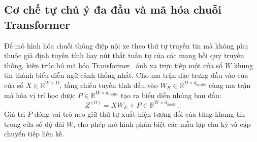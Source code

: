 \documentclass[12pt, a4paper, reqno, oneside]{book}
\begin{document}
\subsection{Cơ chế tự chú ý đa đầu và mã hóa chuỗi Transformer}\label{subsec:self-attention}
Để mô hình hóa chuỗi thông điệp nội xe theo thứ tự truyền tin mà không phụ thuộc giả định tuyến tính hay nút thắt tuần tự của các mạng hồi quy truyền thống, kiến trúc bộ mã hóa Transformer~\cite{vaswani2017attention} ánh xạ trực tiếp một cửa sổ $W$ khung tin thành biểu diễn ngữ cảnh thống nhất. Cho ma trận đặc trưng đầu vào của cửa sổ $X \in \mathbb{R}^{W \times D}$, tầng chiếu tuyến tính đầu vào $W_E \in \mathbb{R}^{D \times d_{\text{model}}}$ cùng ma trận mã hóa vị trí học được $P \in \mathbb{R}^{W \times d_{\text{model}}}$ tạo ra biểu diễn nhúng ban đầu:
\begin{equation}\label{eq:pos-encoding}
Z^{(0)} = X W_E + P \in \mathbb{R}^{W \times d_{\text{model}}}.
\end{equation}
Giá trị $P$ đóng vai trò neo giữ thứ tự xuất hiện tương đối của từng khung tin trong cửa sổ độ dài $W$, cho phép mô hình phân biệt các mẫu lặp chu kỳ và cặp chuyển tiếp liền kề.
\end{document}
